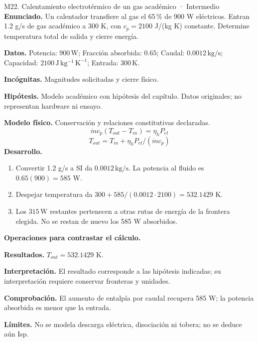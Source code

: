 \begin{studiumworked}{M22. Calentamiento electrotérmico de un gas académico · Intermedio}
\textbf{Enunciado.} Un calentador transfiere al gas el 65\,\% de 900 W eléctricos. Entran 1.2 g/s de gas académico a 300 K, con $c_p=2100$ J/(kg K) constante. Determine temperatura total de salida y cierre energía.

\textbf{Datos.} Potencia: $900\,\mathrm{W}$; Fracción absorbida: $0.65$; Caudal: $0.0012\,\mathrm{kg/s}$; Capacidad: $2100\,\mathrm{J\,kg^{-1}\,K^{-1}}$; Entrada: $300\,\mathrm{K}$.

\textbf{Incógnitas.} Magnitudes solicitadas y cierre físico.

\textbf{Hipótesis.} Modelo académico con hipótesis del capítulo. Datos originales; no representan hardware ni ensayo.

\textbf{Modelo físico.} Conservación y relaciones constitutivas declaradas.
\[\dot m c_p(T_{out}-T_{in})=\eta_hP_{el}\]
\[T_{out}=T_{in}+\eta_hP_{el}/(\dot m c_p)\]
\textbf{Desarrollo.}
\begin{enumerate}
\item Convertir 1.2 g/s a SI da $0.0012\,\mathrm{kg/s}$. La potencia al fluido es $0.65(900)=585$ W.
\item Despejar temperatura da $300+585/(0.0012\cdot2100)=532.1429$ K.
\item Los $315\,\mathrm{W}$ restantes pertenecen a otras rutas de energía de la frontera elegida. No se restan de nuevo los 585 W absorbidos.
\end{enumerate}
\textbf{Operaciones para contrastar el cálculo.}

\textbf{Resultados.} $T_{out}=532.1429$ K.

\textbf{Interpretación.} El resultado corresponde a las hipótesis indicadas; su interpretación requiere conservar fronteras y unidades.

\textbf{Comprobación.} El aumento de entalpía por caudal recupera 585 W; la potencia absorbida es menor que la entrada.

\textbf{Límites.} No se modela descarga eléctrica, disociación ni tobera; no se deduce aún Isp.
\end{studiumworked}
